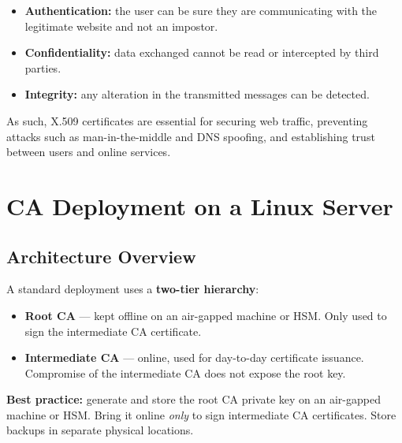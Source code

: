 \documentclass[10pt,twocolumn]{article}
\begin{document}
\begin{itemize}
  \item \textbf{Authentication:} the user can be sure they are communicating
        with the legitimate website and not an impostor.
  \item \textbf{Confidentiality:} data exchanged cannot be read or intercepted
        by third parties.
  \item \textbf{Integrity:} any alteration in the transmitted messages can be
        detected.
\end{itemize}

As such, X.509 certificates are essential for securing web traffic, preventing
attacks such as man-in-the-middle and DNS spoofing, and establishing trust
between users and online services.

\section{CA Deployment on a Linux Server}

\subsection{Architecture Overview}

A standard deployment uses a \textbf{two-tier hierarchy}:

\begin{itemize}
  \item \textbf{Root CA} --- kept offline on an air-gapped machine or HSM.
        Only used to sign the intermediate CA certificate.
  \item \textbf{Intermediate CA} --- online, used for day-to-day certificate
        issuance. Compromise of the intermediate CA does not expose the
        root key.
\end{itemize}

\begin{infobox}
\footnotesize
\textbf{Best practice:} generate and store the root CA private key on an
air-gapped machine or HSM. Bring it online \emph{only} to sign intermediate
CA certificates. Store backups in separate physical locations.
\end{infobox}
\end{document}
